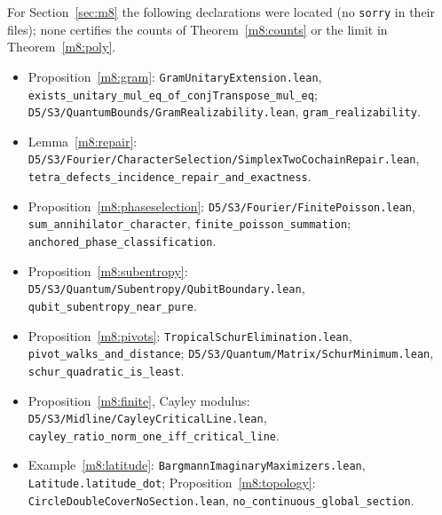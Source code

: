 \documentclass[11pt,reqno]{amsart}
\theoremstyle{definition}
\theoremstyle{remark}
\numberwithin{equation}{section}
\begin{document}
For Section~\ref{sec:m8} the following declarations were located (no \texttt{sorry} in their files); none certifies the counts of
Theorem~\ref{m8:counts} or the limit in Theorem~\ref{m8:poly}.
{\small\raggedright
\begin{itemize}[leftmargin=1.5em]
\item Proposition~\ref{m8:gram}: \texttt{GramUnitaryExtension.lean}, \texttt{exists\_unitary\_mul\_eq\_of\_conjTranspose\_mul\_eq};
\texttt{D5/S3/QuantumBounds/GramRealizability.lean}, \texttt{gram\_realizability}.
\item Lemma~\ref{m8:repair}: \texttt{D5/S3/Fourier/CharacterSelection/SimplexTwoCochainRepair.lean},
\texttt{tetra\_defects\_incidence\_repair\_and\_exactness}.
\item Proposition~\ref{m8:phaseselection}: \texttt{D5/S3/Fourier/FinitePoisson.lean}, \texttt{sum\_annihilator\_character},
\texttt{finite\_poisson\_summation}; \texttt{anchored\_phase\_classification}.
\item Proposition~\ref{m8:subentropy}: \texttt{D5/S3/Quantum/Subentropy/QubitBoundary.lean}, \texttt{qubit\_subentropy\_near\_pure}.
\item Proposition~\ref{m8:pivots}: \texttt{TropicalSchurElimination.lean}, \texttt{pivot\_walks\_and\_distance};
\texttt{D5/S3/Quantum/Matrix/SchurMinimum.lean}, \texttt{schur\_quadratic\_is\_least}.
\item Proposition~\ref{m8:finite}, Cayley modulus: \texttt{D5/S3/Midline/CayleyCriticalLine.lean}, \texttt{cayley\_ratio\_norm\_one\_iff\_critical\_line}.
\item Example~\ref{m8:latitude}: \texttt{BargmannImaginaryMaximizers.lean}, \texttt{Latitude.latitude\_dot}; Proposition~\ref{m8:topology}:
\texttt{CircleDoubleCoverNoSection.lean}, \texttt{no\_continuous\_global\_section}.
\end{itemize}}
\end{document}
